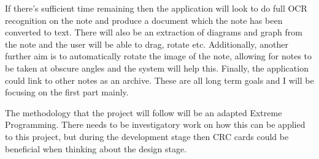 \documentclass[11pt,fleqn,twoside]{article}
\begin{document}
If there's sufficient time remaining then the application will look to do full OCR recognition on the note and produce a document which the note has been converted to text. There will also be an extraction of diagrams and graph from the note and the user will be able to drag, rotate etc. Additionally, another further aim is to automatically rotate the image of the note, allowing for notes to be taken at obscure angles and the system will help this. Finally, the application could link to other notes as an archive. These are all long term goals and I will be focusing on the first part mainly.

The methodology that the project will follow will be an adapted Extreme Programming. There needs to be investigatory work on how this can be applied to this project, but during the development stage then CRC cards could be beneficial when thinking about the design stage.
\end{document}
